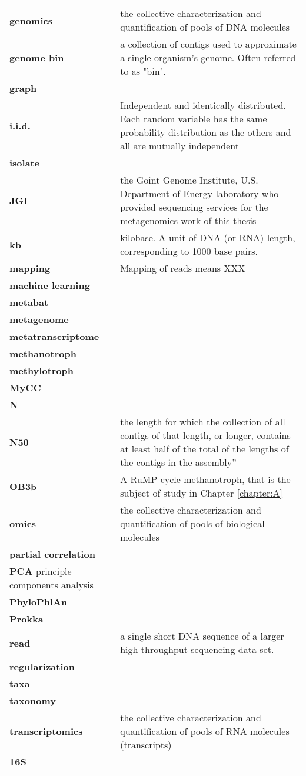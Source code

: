 \begin{singlespace}
\begin{longtable}{ p{}  p{} }
\textbf{genomics} & the collective characterization and quantification of pools of DNA molecules \\
\textbf{genome bin} & a collection of contigs used to approximate a single organism's genome.  Often referred to as "bin". \\
\textbf{graph} &  \\
\textbf{i.i.d.} & Independent and identically distributed.
    Each random variable has the same probability distribution as the others and all are mutually independent \\
\textbf{isolate} & \\
\textbf{JGI} & the Goint Genome Institute, U.S. Department of Energy laboratory who provided sequencing services for the metagenomics work of this thesis \\
\textbf{kb} & kilobase. A unit of DNA (or RNA) length, corresponding to 1000 base pairs. \\
\textbf{mapping} & Mapping of reads means XXX \\
\textbf{machine learning} &  \\
\textbf{metabat} &  \\
\textbf{metagenome} &  \\
\textbf{metatranscriptome} &  \\
\textbf{methanotroph} &  \\
\textbf{methylotroph} &  \\
\textbf{MyCC} &  \\
\textbf{N} &  \\
\textbf{N50} & the length for which the collection of all contigs of that length, or longer, contains at least half of the total of the
                lengths of the contigs in the assembly” \\ %
\textbf{OB3b} & A RuMP cycle methanotroph, that is the subject of study in Chapter \ref{chapter:A}  \\
\textbf{omics} & the collective characterization and quantification of pools of biological molecules \\
\textbf{partial correlation} &  \\
\textbf{PCA} principle components analysis &  \\
\textbf{PhyloPhlAn} &  \\
\textbf{Prokka} &  \\
\textbf{read} & a single short DNA sequence of a larger high-throughput sequencing data set. \\
\textbf{regularization} &  \\
\textbf{taxa} &  \\
\textbf{taxonomy} &  \\
\textbf{transcriptomics} & the collective characterization and quantification of pools of RNA molecules (transcripts) \\
\textbf{16S} &  \\

\end{longtable}
\end{singlespace}

